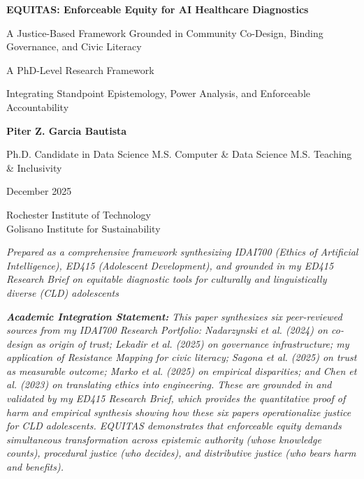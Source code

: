 \documentclass[12pt,a4paper]{article}
\begin{document}
\begin{titlepage}
\centering
\vspace*{2.5cm}

{\Large \textbf{EQUITAS: Enforceable Equity for AI Healthcare Diagnostics}}

\vspace{0.6cm}

{\large A Justice-Based Framework Grounded in Community Co-Design, Binding Governance, and Civic Literacy}

\vspace{1.6cm}

{\normalsize A PhD-Level Research Framework}

\vspace{1.6cm}

{\normalsize Integrating Standpoint Epistemology, Power Analysis, and Enforceable Accountability}

\vspace{2.4cm}

{\large \textbf{Piter Z. Garcia Bautista} \par}
{\large Ph.D. Candidate in Data Science \textbullet{} M.S. Computer \& Data Science \textbullet{} M.S. Teaching \& Inclusivity}

\vspace{0.3cm}

{\normalsize December 2025}

\vspace{2.5cm}

{\small Rochester Institute of Technology \\ Golisano Institute for Sustainability}

\vfill

{
\footnotesize \textit{Prepared as a comprehensive framework synthesizing IDAI700 (Ethics of Artificial Intelligence), ED415 (Adolescent Development), and grounded in my ED415 Research Brief on equitable diagnostic tools for culturally and linguistically diverse (CLD) adolescents} \\

\vspace{0.3cm}

\textit{\tiny\textbf{Academic Integration Statement:} This paper synthesizes six peer-reviewed sources from my IDAI700 Research Portfolio: Nadarzynski et al. (2024) on co-design as origin of trust; Lekadir et al. (2025) on governance infrastructure; my application of Resistance Mapping for civic literacy; Sagona et al. (2025) on trust as measurable outcome; Marko et al. (2025) on empirical disparities; and Chen et al. (2023) on translating ethics into engineering. These are grounded in and validated by my ED415 Research Brief, which provides the quantitative proof of harm and empirical synthesis showing how these six papers operationalize justice for CLD adolescents. EQUITAS demonstrates that enforceable equity demands simultaneous transformation across epistemic authority (whose knowledge counts), procedural justice (who decides), and distributive justice (who bears harm and benefits).}
}

\end{titlepage}
\end{document}
